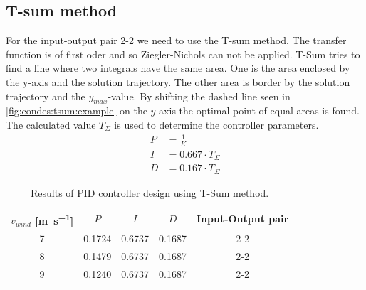 \subsection{T-sum method} \label{sec:condes:Tsum}

For the input-output pair 2-2 we need to use the T-sum method.
The transfer function is of first oder and so Ziegler-Nichols can not be applied.
T-Sum tries to find a line where two integrals have the same area. 
One is the area enclosed by the y-axis and the solution trajectory.
The other area is border by the solution trajectory and the $y_{max}$-value.
By shifting the dashed line seen in \autoref{fig:condes:tsum:example} on the $y$-axis the optimal point of equal areas is found.
The calculated value $T_{\Sigma}$ is used to determine the controller parameters.
\begin{align}
    P &= \frac{1}{K} \\
    I &= 0.667 \cdot T_{\Sigma} \\
    D &= 0.167 \cdot T_{\Sigma}
\end{align}

\begin{table}[H]
    \caption{Results of PID controller design using T-Sum method.}
    \centering
    \begin{tabular}{ccccc} \toprule
        $v_{wind}$ [\si{\metre\per\second}] &$P$ & $I$ & $D$ & Input-Output pair \\ \midrule
        7 & 0.1724 & 0.6737 & 0.1687 & 2-2 \\
        8 & 0.1479 & 0.6737 & 0.1687 & 2-2 \\ 
        9 & 0.1240 & 0.6737 & 0.1687 & 2-2 \\ \bottomrule
    \end{tabular}
    \label{tab:condes:tsum:results}
\end{table}

